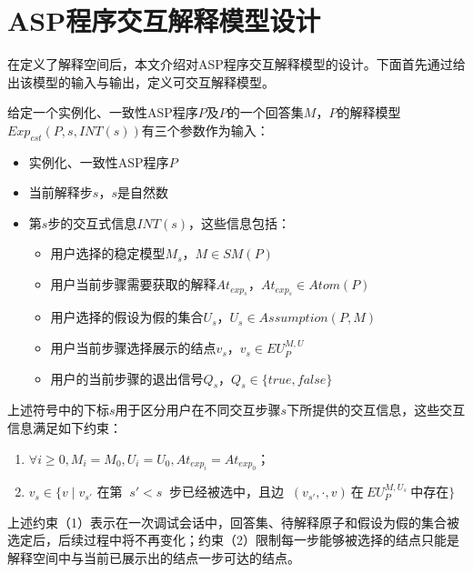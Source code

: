 \section{ASP程序交互解释模型设计}
在定义了解释空间后，本文介绍对ASP程序交互解释模型的设计。下面首先通过给出该模型的输入与输出，定义可交互解释模型。
\begin{definition}[可交互解释模型]
    给定一个实例化、一致性ASP程序$P$及$P$的一个回答集$M$，$P$的解释模型$Exp_{cst}(P, s, INT(s))$有三个参数作为输入：
    \begin{itemize}[topsep=0pt]
        \setlength\itemsep{-0.3em}
        \item 实例化、一致性ASP程序$P$
        \item 当前解释步$s$，$s$是自然数
        \item 第$s$步的交互式信息$INT(s)$，这些信息包括：
        \begin{itemize}[label=$\circ$,topsep=0pt]
            \setlength\itemsep{-0.3em}
            \item 用户选择的稳定模型$M_s$，$M \in SM(P)$
            \item 用户当前步骤需要获取的解释$At_{exp_{s}}$，$At_{exp_{s}} \in Atom(P)$
            \item 用户选择的假设为假的集合$U_s$，$U_s \in Assumption(P, M)$
            \item 用户当前步骤选择展示的结点$v_s$，$v_s \in EU^{M, U}_P$
            \item 用户的当前步骤的退出信号$Q_s$，$Q_s \in \{true, false\}$
        \end{itemize}
    \end{itemize}
    
    上述符号中的下标$s$用于区分用户在不同交互步骤$s$下所提供的交互信息，这些交互信息满足如下约束：
    \begin{enumerate}[label=(\arabic*),topsep=0pt]
        \setlength\itemsep{-0.3em}
        \item $\forall i \ge 0, M_i = M_0, U_i=U_0, At_{exp_i}=At_{exp_0}$；
        \item $v_s \in \{v \mid v_{s'} \text{ 在第 }\ s' < s\ \text{ 步已经被选中，且边 }\ (v_{s'}, \cdot, v)\ \text{在}\ EU^{M, U_s}_P\ \text{中存在}\}$
    \end{enumerate}
    
    上述约束（1）表示在一次调试会话中，回答集、待解释原子和假设为假的集合被选定后，后续过程中将不再变化；约束（2）限制每一步能够被选择的结点只能是解释空间中与当前已展示出的结点一步可达的结点。


\end{definition}
